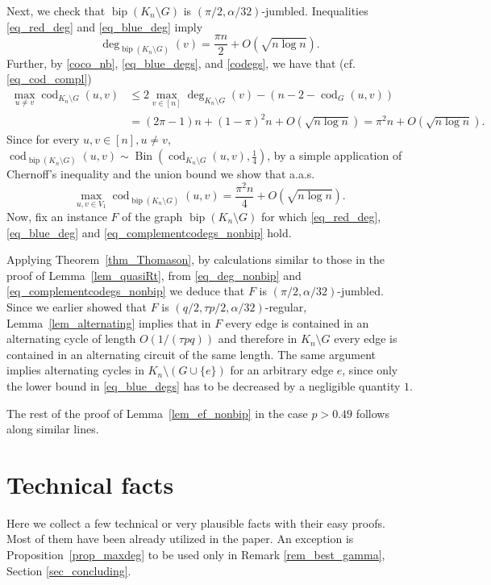 \documentclass[12pt,reqno]{amsart}
\newcommand{\Bi}{\operatorname{Bin}}
\newcommand{\cod}{\operatorname{cod}}
\newcommand{\bip}{\operatorname{bip}}
\theoremstyle{definition}
\begin{document}
 Next, we check that $\bip(K_n \setminus G)$ is $(\pi/2, \alpha/32)$-jumbled.
Inequalities \eqref{eq_red_deg} and \eqref{eq_blue_deg} imply
\begin{equation}
\label{eq_deg_nonbip}
  \deg_{\bip(K_n\setminus G)}(v)
  = \frac{\pi n}{2}  + O(\sqrt{n \log n}).
\end{equation}
Further, by \eqref{coco_nb}, \eqref{eq_blue_degs}, and \eqref{codegs}, we have that (cf. \eqref{eq_cod_compl})
	\begin{align*}
	  \max_{u \ne v}\cod_{K_n \setminus G}(u, v) &\le 2\max_{v \in [n]} \deg_{K_n \setminus G}(v) - (n - 2 - \cod_{G}(u,v))\\
&=(2 \pi - 1)n  + (1 - \pi)^2 n + O(\sqrt{n\log n}) = \pi^2 n + O\left( \sqrt{n\log n} \right).
	\end{align*}
Since for every $u, v \in [n], u \ne v$,
$  \cod_{\bip(K_n \setminus G)}(u,v) \sim \Bi( \cod_{K_n \setminus G}(u,v), \tfrac{1}{4})$,
	by a simple application of Chernoff's inequality and the union bound we show that a.a.s.
\begin{equation}
  \label{eq_complementcodegs_nonbip}
  \max_{u,v \in V_1} \cod_{\bip \left( K_n \setminus G \right)} (u,v) = \frac{\pi^2n}{4}  + O( \sqrt{n\log n} ).
\end{equation}
Now, fix an instance $F$ of the graph $\bip(K_n \setminus G)$ for which \eqref{eq_red_deg}, \eqref{eq_blue_deg} and \eqref{eq_complementcodegs_nonbip} hold.


Applying Theorem~\ref{thm_Thomason}, by calculations similar to those in the proof of Lemma~\ref{lem_quasiRt}, from \eqref{eq_deg_nonbip} and \eqref{eq_complementcodegs_nonbip} we deduce that $F$ is $( \pi/2, \alpha/32)$-jumbled.
Since we earlier showed that $F$ is $(q/2, \tau p/2, \alpha/32)$-regular, Lemma~\ref{lem_alternating} implies that in $F$  every edge is contained in an alternating cycle of length $O\left( 1/(\tau p q) \right)$ and therefore in $K_n \setminus G$ every edge is contained in an alternating circuit of the same length. The same argument implies alternating cycles in $K_n \setminus (G \cup \{e\})$ for an arbitrary edge $e$, since only the lower bound in \eqref{eq_blue_degs} has to be decreased by a negligible quantity $1$.

The rest of the proof of Lemma~\ref{lem_ef_nonbip} in the case $p > 0.49$ follows along similar lines.


	\section{Technical facts}
	\label{sec_technical}
	Here we collect a few technical or very plausible facts with their easy proofs. Most of them have been already utilized in the paper. An exception is Proposition~\ref{prop_maxdeg} to be used only in Remark \ref{rem_best_gamma}, Section  \ref{sec_concluding}.
\end{document}

